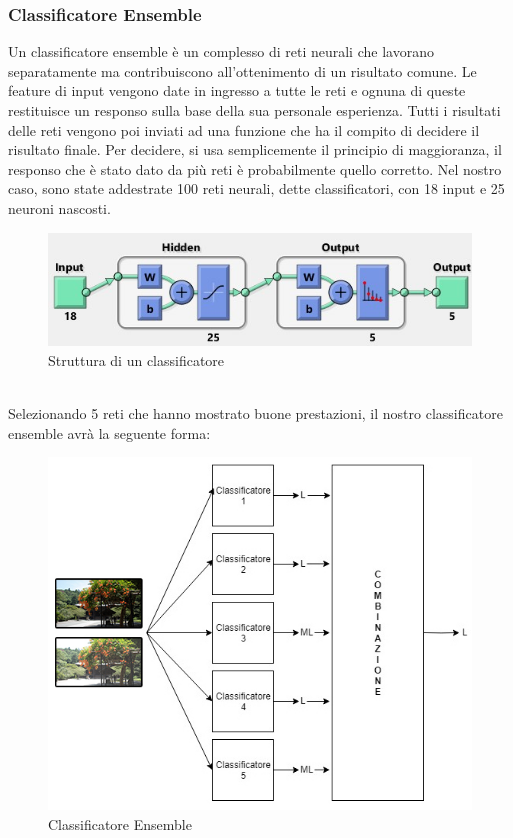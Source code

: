 \documentclass[a4paper,11pt]{article}
\begin{document}
    \subsubsection{Classificatore Ensemble}
    Un classificatore ensemble  è un complesso di reti neurali che lavorano separatamente ma contribuiscono all'ottenimento di un risultato comune.
    Le feature di input vengono date in ingresso a tutte le reti e ognuna di queste restituisce un responso sulla base della sua personale esperienza. Tutti i risultati delle reti vengono poi inviati ad una funzione che ha il compito di decidere il risultato finale.
    Per decidere, si usa semplicemente il principio di maggioranza, il responso che è stato dato da più reti è probabilmente quello corretto.
    Nel nostro caso, sono state addestrate 100 reti neurali, dette classificatori, con 18 input e 25 neuroni nascosti. 
    \begin{figure}[h]
        \centering
        \includegraphics[scale=0.9]{strutturaRete2}
        \caption{Struttura di un classificatore}
    \end{figure}
    \\Selezionando 5 reti che hanno mostrato buone prestazioni, il nostro classificatore ensemble avrà la seguente forma:
    \begin{figure}[h]
        \centering
        \includegraphics[scale=0.55]{classifier}
        \caption{Classificatore Ensemble}
    \end{figure}
\end{document}
